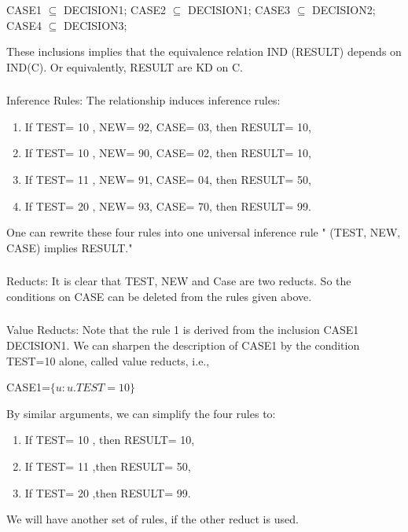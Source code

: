 \documentclass[12pt]{article}
\begin{document}
\begin{center}
CASE1 $\subseteq$  DECISION1;     CASE2 $\subseteq$  DECISION1;\newline
CASE3 $\subseteq$  DECISION2;     CASE4 $\subseteq$  DECISION3;\newline
\end{center}

These inclusions implies that the equivalence relation IND (RESULT) depends on IND(C). Or equivalently, RESULT are KD on C.

\subsubsection {}Inference Rules: The relationship induces inference rules:
\begin{enumerate}
\item If  TEST=  10 , NEW= 92,  CASE= 03, then RESULT= 10,
\item If  TEST=  10 , NEW= 90,  CASE= 02, then RESULT= 10,
\item If  TEST=  11 , NEW= 91,  CASE= 04, then RESULT= 50,
\item If  TEST=  20 , NEW= 93,  CASE= 70, then RESULT= 99.
\end{enumerate}
One can rewrite these four rules into one universal inference rule " (TEST, NEW, CASE) implies RESULT."

\subsubsection {}Reducts: It is clear that  {TEST, NEW} and {Case} are two reducts. So the conditions on CASE can be deleted from the rules given above.

\subsubsection {}
Value Reducts: Note that the rule 1 is derived from the inclusion CASE1 DECISION1.  We can sharpen the description of CASE1 by the condition TEST=10 alone, called value reducts, i.e.,
\begin{center}
CASE1=$\{ u: u.TEST=10\}$
\end{center}
By similar arguments, we can simplify the four rules to:
\begin{enumerate}
\item If  TEST=  10 , then RESULT= 10,
\item If  TEST=  11 ,then RESULT= 50,
\item If  TEST=  20 ,then RESULT= 99.
\end{enumerate}
We will have another set of rules, if the other reduct is used.
\end{document}
